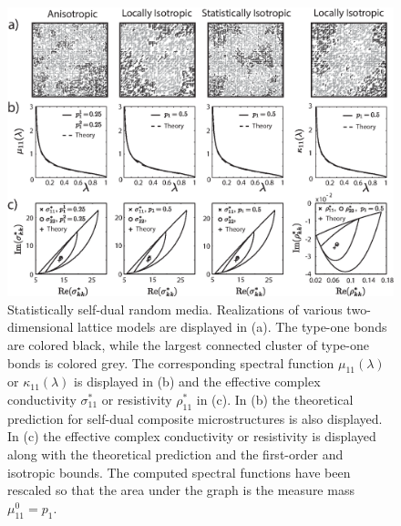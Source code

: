 \documentclass{cmslatex}
\begin{document}
%
%
\begin{figure}[t]
  \centerline{\includegraphics[scale=0.69]{A_Duality_RRN_11.eps}}
\caption{Statistically self-dual random media. Realizations of various 
  two-dimensional lattice models are displayed in (a). The type-one
  bonds are colored black, while the largest connected cluster of
  type-one bonds is colored grey. The corresponding spectral function
  $\mu_{11}(\lambda)$ or $\kappa_{11}(\lambda)$ is displayed in (b) and the effective
  complex conductivity $\sigma^*_{11}$ or resistivity $\rho^*_{11}$ in (c). In
  (b) the theoretical prediction for self-dual composite
  microstructures is also displayed. In (c) the effective 
  complex conductivity or resistivity is displayed along with the
  theoretical prediction and the first-order and isotropic bounds. The
  computed spectral functions have been rescaled so that the area
  under the graph is the measure mass $\mu^0_{11}=p_1$.                
        }
\label{fig:Duality_RRN_11}
\end{figure}
%
\end{document}
